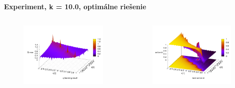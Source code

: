 \documentclass[xcolor=dvipsnames]{beamer}
\begin{document}
\begin{frame}{\bf Experiment, k = 10.0, optimálne riešenie}

\begin{columns}
	\begin{column}{0.5\textwidth}

        \begin{figure}[ht]

        \begin{center}
        \includegraphics[width=1.0\textwidth]{experiment_03/table/q_map.png}
        \end{center}

        \end{figure}

	\end{column}
	\begin{column}{0.5\textwidth}

        \begin{figure}[ht]

        \begin{center}
        \includegraphics[width=1.0\textwidth]{experiment_03/table/q_action_id.png}
        \end{center}


\end{figure}
\end{column}
\end{columns}
\end{frame}
\end{document}
